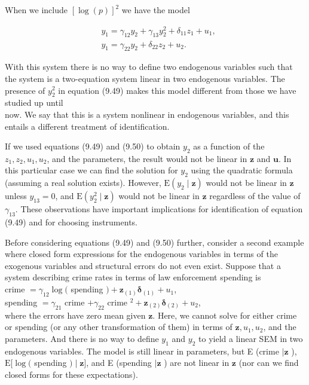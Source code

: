\documentclass[10pt]{article}
\begin{document}
When we include $[\log (p)]^{2}$ we have the model


\begin{align*}
& y_{1}=\gamma_{12} y_{2}+\gamma_{13} y_{2}^{2}+\delta_{11} z_{1}+u_{1},  \tag{9.49}\\
& y_{1}=\gamma_{22} y_{2}+\delta_{22} z_{2}+u_{2} . \tag{9.50}
\end{align*}


With this system there is no way to define two endogenous variables such that the system is a two-equation system linear in two endogenous variables. The presence of $y_{2}^{2}$ in equation (9.49) makes this model different from those we have studied up until\\
now. We say that this is a system nonlinear in endogenous variables, and this entails a different treatment of identification.

If we used equations (9.49) and (9.50) to obtain $y_{2}$ as a function of the $z_{1}, z_{2}, u_{1}, u_{2}$, and the parameters, the result would not be linear in $\mathbf{z}$ and $\mathbf{u}$. In this particular case we can find the solution for $y_{2}$ using the quadratic formula (assuming a real solution exists). However, $\mathrm{E}\left(y_{2} \mid \mathbf{z}\right)$ would not be linear in $\mathbf{z}$ unless $y_{13}=0$, and $\mathrm{E}\left(y_{2}^{2} \mid \mathbf{z}\right)$ would not be linear in $\mathbf{z}$ regardless of the value of $\gamma_{13}$. These observations have important implications for identification of equation (9.49) and for choosing instruments.

Before considering equations (9.49) and (9.50) further, consider a second example where closed form expressions for the endogenous variables in terms of the exogenous variables and structural errors do not even exist. Suppose that a system describing crime rates in terms of law enforcement spending is\\
crime $=\gamma_{12} \log ($ spending $)+\mathbf{z}_{(1)} \boldsymbol{\delta}_{(1)}+u_{1}$,\\
spending $=\gamma_{21}$ crime $+\gamma_{22}$ crime $^{2}+\mathbf{z}_{(2)} \boldsymbol{\delta}_{(2)}+u_{2}$,\\
where the errors have zero mean given $\mathbf{z}$. Here, we cannot solve for either crime or spending (or any other transformation of them) in terms of $\mathbf{z}, u_{1}, u_{2}$, and the parameters. And there is no way to define $y_{1}$ and $y_{2}$ to yield a linear SEM in two endogenous variables. The model is still linear in parameters, but E (crime $\mid \mathbf{z}$ ), $\mathrm{E}[\log ($ spending $) \mid \mathbf{z}]$, and E (spending $\mid \mathbf{z}$ ) are not linear in $\mathbf{z}$ (nor can we find closed forms for these expectations).
\end{document}
